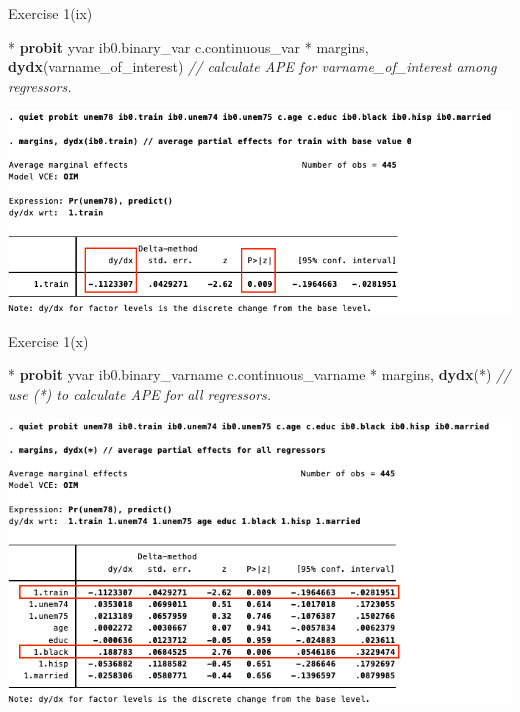 \documentclass[
  10pt,
  ignorenonframetext,
]{beamer}
\newenvironment{Shaded}{\begin{snugshade}}{\end{snugshade}}
\newcommand{\CommentTok}[1]{\textcolor[rgb]{0.56,0.35,0.01}{\textit{#1}}}
\newcommand{\KeywordTok}[1]{\textcolor[rgb]{0.13,0.29,0.53}{\textbf{#1}}}
\newcommand{\NormalTok}[1]{#1}
\begin{document}
\begin{frame}[fragile]{Exercise 1(ix)}
\protect\hypertarget{PROBITtrainAPE}{}
\footnotesize

\begin{Shaded}
\begin{Highlighting}[]
\NormalTok{* }\KeywordTok{probit}\NormalTok{ yvar ib0.binary\_var c.continuous\_var}
\NormalTok{* margins, }\KeywordTok{dydx}\NormalTok{(varname\_of\_interest)}
\CommentTok{// calculate APE for varname\_of\_interest among regressors.}
\end{Highlighting}
\end{Shaded}

\begin{center}\includegraphics[width=0.9\linewidth]{pictures/PROBITtrainAPE} \end{center}
\end{frame}

\begin{frame}[fragile]{Exercise 1(x)}
\protect\hypertarget{PROBITallAPE}{}
\footnotesize

\begin{Shaded}
\begin{Highlighting}[]
\NormalTok{* }\KeywordTok{probit}\NormalTok{ yvar ib0.binary\_varname c.continuous\_varname}
\NormalTok{* margins, }\KeywordTok{dydx}\NormalTok{(*)}
\CommentTok{// use (*) to calculate APE for all regressors.}
\end{Highlighting}
\end{Shaded}

\begin{center}\includegraphics[width=0.9\linewidth]{pictures/PROBITallAPE} \end{center}
\end{frame}
\end{document}
